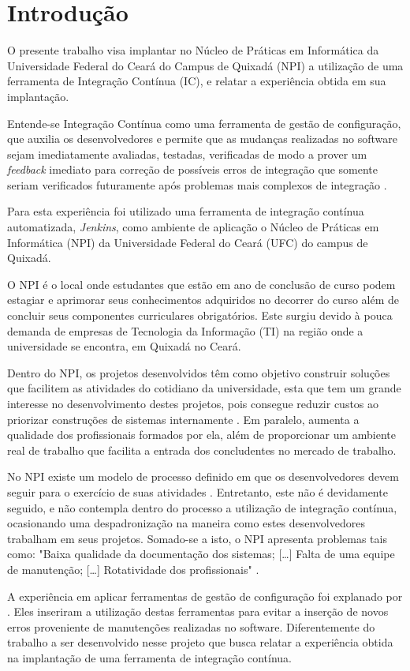 \chapter{Introdução}

O presente trabalho visa implantar no Núcleo de Práticas em Informática da Universidade Federal do Ceará do Campus de Quixadá (NPI) a utilização de uma ferramenta de Integração Contínua (IC), e relatar a experiência obtida em sua implantação.

Entende-se Integração Contínua como uma ferramenta de gestão de configuração, que auxilia os desenvolvedores e permite que as mudanças realizadas no software sejam imediatamente avaliadas, testadas, verificadas de modo a prover um  \textit{feedback} imediato para correção de possíveis erros de integração que somente seriam verificados futuramente após problemas mais complexos de integração \cite{paul2007}.

Para esta experiência foi utilizado uma ferramenta de integração contínua automatizada, \textit{Jenkins}, como ambiente de aplicação o Núcleo de Práticas em Informática (NPI) da Universidade Federal do Ceará (UFC) do campus de Quixadá.

O NPI é o local onde estudantes que estão em ano de conclusão de curso podem estagiar e aprimorar seus conhecimentos adquiridos no decorrer do curso além de concluir seus componentes curriculares obrigatórios. Este surgiu devido à pouca demanda de empresas de Tecnologia da Informação (TI) na região onde a universidade se encontra, em Quixadá no Ceará.

Dentro do NPI, os projetos desenvolvidos têm como objetivo construir soluções que facilitem as atividades do cotidiano da universidade, esta que tem um grande interesse no desenvolvimento destes projetos, pois consegue reduzir custos ao priorizar construções de sistemas internamente \cite{npi2013}. Em paralelo, aumenta a qualidade dos profissionais formados por ela, além de proporcionar um ambiente real de trabalho que facilita a entrada dos concludentes no mercado de trabalho.

No NPI existe um modelo de processo definido em que os desenvolvedores devem seguir para o exercício de suas atividades \cite{npi2013}. Entretanto, este não é devidamente seguido, e não contempla dentro do processo a utilização de integração contínua, ocasionando uma despadronização na maneira como estes  desenvolvedores trabalham em seus projetos. Somado-se a isto, o NPI apresenta problemas tais como: "Baixa qualidade da documentação dos sistemas; [\ldots] Falta de uma equipe de manutenção; [\ldots] Rotatividade dos profissionais" \cite[p.~4]{paduelli2006}.

A experiência em aplicar ferramentas de gestão de configuração foi explanado por . Eles inseriram a utilização destas ferramentas para evitar a inserção de novos erros proveniente de manutenções realizadas no software. Diferentemente do trabalho a ser desenvolvido nesse projeto que busca relatar a experiência obtida na implantação de uma ferramenta de integração contínua.
